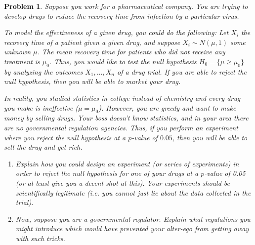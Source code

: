 \documentclass{article}
\newtheorem{problem}{Problem}
\begin{document}
\clearpage
\begin{problem}
Suppose you work for a pharmaceutical company.
You are trying to develop drugs to reduce the recovery time from infection by a particular virus.

To model the effectiveness of a given drug, you could do the following:
    Let $X_i$ the recovery time of a patient given a given drug, and suppose $X_i\sim N(\mu,1)$ some unknown $\mu$.
    The mean recovery time for patients who did not receive any treatment is $\mu_0$. Thus, you would like to test the null hypothesis $H_0 = \{ \mu \geq \mu_0 \}$ by analyzing the outcomes $X_1, \ldots, X_n$ of a drug trial.
    If you are able to reject the null hypothesis, then you will be able to market your drug.

    In reality, you studied statistics in college instead of chemistry and every drug you make is ineffective ($\mu = \mu_0$).
    However, you are greedy and want to make money by selling drugs. 
    Your boss doesn't know statistics, and in your area there are no governmental regulation agencies.
    Thus, if you perform an experiment where you reject the null hypothesis at a $p$-value of $0.05$, then you will be able to sell the drug and get rich.
    
    \begin{enumerate}[label=(\alph*),topsep=0pt]
        \item Explain how you could design an experiment (or series of experiments) in order to reject the null hypothesis for one of your drugs at a $p$-value of 0.05 (or at least give you a decent shot at this).
            Your experiments should be scientifically legitimate (i.e. you cannot just lie about the data collected in the trial).

        \item Now, suppose you are a governmental regulator. 
            Explain what regulations you might introduce which would have prevented your alter-ego from getting away with such tricks.
    
    \end{enumerate}

\end{problem}
\end{document}
